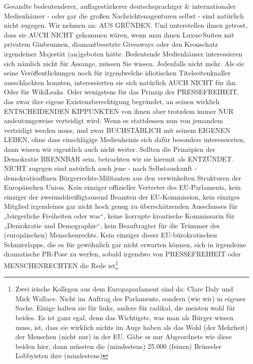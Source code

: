 \begin{multicols}{2}
{\textCR
Gesandte bedeutenderer, auflagestärkerer deutschsprachiger \& internationaler Medienhäuser - oder gar
die großen Nachrichtenagenturen selbst - sind natürlich nicht zugegen. Wir nehmen an: AUS GRÜNDEN.
Und unterstellen ihnen getrost, dass sie AUCH NICHT
gekommen wären, wenn man ihnen Luxus-Suiten mit
privatem Ginbrunnen, diamantbesetzte Giveaways oder
den Kronschatz irgendeiner Majestät (an)geboten hätte.
\textCR
Bedeutende Medienhäuser interessieren sich nämlich
nicht für Assange, müssen Sie wissen. Jedenfalls nicht
mehr. Als sie seine Veröffentlichungen noch für irgendwelche idiotischen Titelseitenknaller ausschlachten
konnten, interessierten sie sich natürlich AUCH NICHT
für ihn. Oder für WikiLeaks. Oder wenigstens für das
Prinzip der PRESSEFREIHEIT, das zwar ihre eigene Existenzberechtigung begründet, an seinen wirklich ENTSCHEIDENDEN KIPPUNKTEN von ihnen aber trotzdem
immer NUR andeutungsweise verteidigt wird.
\textCR
Wenn es stattdessen nun von jemandem verteidigt werden muss, und zwar BUCHSTÄBLICH mit seinem EIGENEN LEBEN, ohne dass einschlägige Medienheinis sich
dafür besonders interessierten, dann wissen wir eigentlich auch nicht weiter. Sollten die Prinzipien der Demokratie BRENNBAR sein, betrachten wir sie hiermit als
ENTZÜNDET.
\textCR
NICHT zugegen sind natürlich auch jene - nach Selbstauskunft - demokratieaffinen Bürgerrechts-Militanten
aus den verwinkelten Strukturen der Europäischen Union. Kein einziger offizieller Vertreter des EU-Parlaments,
kein einziger der zweiunddreißigtausend Beamten der
EU-Kommission, kein einziges Mitglied irgendeines
gar nicht hoch genug zu überschätzenden Ausschusses
für „bürgerliche Freiheiten oder was“, keine korrupte
kroatische Kommissarin für „Demokratie und Demographie“, kein Beauftragter für die Trümmer des (europäischen) Menschenrechts. Kein einziger dieser EU-bürokratischen Schmierlapps, die es für gewöhnlich gar
nicht erwarten können, sich in irgendeine dramatische
PR-Pose zu werfen, sobald irgendwo von PRESSEFREIHEIT oder MENSCHENRECHTEN die Rede 
ist\footnote[10]{Zwei irische Kollegen aus dem Europaparlament sind da: Clare Daly und Mick Wallace. Nicht im Auftrag des
Parlaments, sondern (wie wir) in eigener Sache. Einige halten sie für links, andere für radikal, die meisten wohl
für beides. Es ist ganz egal, denn das Wichtigste, was man als Bürger wissen muss, ist, dass sie wirklich nichts
im Auge haben als das Wohl (der Mehrheit) der Menschen (nicht nur) in der EU. Gäbe es nur Abgeordnete wie
diese beiden hier, dann müssten die (mindestens) 25.000 (feinen) Brüsseler Lobbyisten ihre (mindestens)
}}
\end{multicols}

